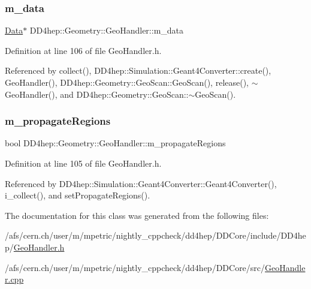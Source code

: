 \subsubsection{\texorpdfstring{m\+\_\+data}{m\_data}}
{\footnotesize\ttfamily \hyperlink{class_d_d4hep_1_1_geometry_1_1_geo_handler_types_a568935b7e878d3ea9fe97a2ecf33d641}{Data}$\ast$ D\+D4hep\+::\+Geometry\+::\+Geo\+Handler\+::m\+\_\+data\hspace{0.3cm}{\ttfamily [protected]}}



Definition at line 106 of file Geo\+Handler.\+h.



Referenced by collect(), D\+D4hep\+::\+Simulation\+::\+Geant4\+Converter\+::create(), Geo\+Handler(), D\+D4hep\+::\+Geometry\+::\+Geo\+Scan\+::\+Geo\+Scan(), release(), $\sim$\+Geo\+Handler(), and D\+D4hep\+::\+Geometry\+::\+Geo\+Scan\+::$\sim$\+Geo\+Scan().

\hypertarget{class_d_d4hep_1_1_geometry_1_1_geo_handler_a8fa03e76401899e921dffb88684e89be}{}\label{class_d_d4hep_1_1_geometry_1_1_geo_handler_a8fa03e76401899e921dffb88684e89be} 
\subsubsection{\texorpdfstring{m\+\_\+propagate\+Regions}{m\_propagateRegions}}
{\footnotesize\ttfamily bool D\+D4hep\+::\+Geometry\+::\+Geo\+Handler\+::m\+\_\+propagate\+Regions\hspace{0.3cm}{\ttfamily [protected]}}



Definition at line 105 of file Geo\+Handler.\+h.



Referenced by D\+D4hep\+::\+Simulation\+::\+Geant4\+Converter\+::\+Geant4\+Converter(), i\+\_\+collect(), and set\+Propagate\+Regions().



The documentation for this class was generated from the following files\+:\begin{DoxyCompactItemize}
\item 
/afs/cern.\+ch/user/m/mpetric/nightly\+\_\+cppcheck/dd4hep/\+D\+D\+Core/include/\+D\+D4hep/\hyperlink{_geo_handler_8h}{Geo\+Handler.\+h}\item 
/afs/cern.\+ch/user/m/mpetric/nightly\+\_\+cppcheck/dd4hep/\+D\+D\+Core/src/\hyperlink{_geo_handler_8cpp}{Geo\+Handler.\+cpp}\end{DoxyCompactItemize}
